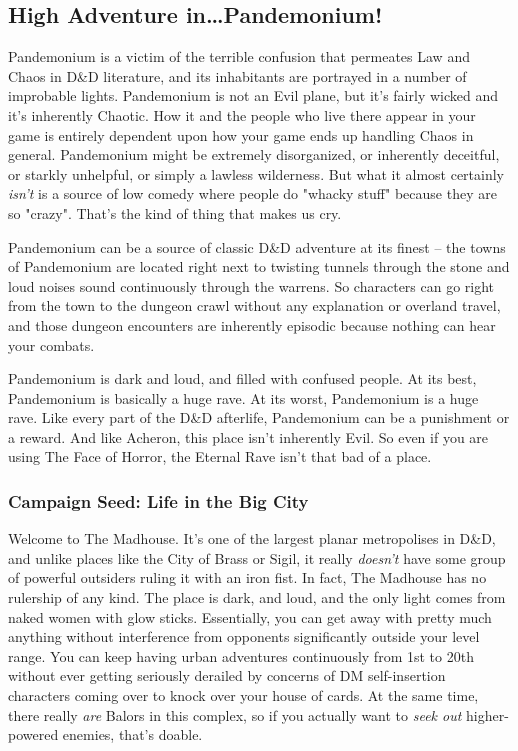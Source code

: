 \subsection{High Adventure in\ldots Pandemonium!}

Pandemonium is a victim of the terrible confusion that permeates Law and Chaos in D\&D literature, and its inhabitants are portrayed in a number of improbable lights. Pandemonium is not an Evil plane, but it's fairly wicked and it's inherently Chaotic. How it and the people who live there appear in your game is entirely dependent upon how your game ends up handling Chaos in general. Pandemonium might be extremely disorganized, or inherently deceitful, or starkly unhelpful, or simply a lawless wilderness. But what it almost certainly \textit{isn't} is a source of low comedy where people do "whacky stuff" because they are so "crazy". That's the kind of thing that makes us cry.

Pandemonium can be a source of classic D\&D adventure at its finest -- the towns of Pandemonium are located right next to twisting tunnels through the stone and loud noises sound continuously through the warrens. So characters can go right from the town to the dungeon crawl without any explanation or overland travel, and those dungeon encounters are inherently episodic because nothing can hear your combats.

Pandemonium is dark and loud, and filled with confused people. At its best, Pandemonium is basically a huge rave. At its worst, Pandemonium is a huge rave. Like every part of the D\&D afterlife, Pandemonium can be a punishment or a reward. And like Acheron, this place isn't inherently Evil. So even if you are using The Face of Horror, the Eternal Rave isn't that bad of a place.

\subsubsection{Campaign Seed: Life in the Big City}

Welcome to The Madhouse. It's one of the largest planar metropolises in D\&D, and unlike places like the City of Brass or Sigil, it really \textit{doesn't} have some group of powerful outsiders ruling it with an iron fist. In fact, The Madhouse has no rulership of any kind. The place is dark, and loud, and the only light comes from naked women with glow sticks. Essentially, you can get away with pretty much anything without interference from opponents significantly outside your level range. You can keep having urban adventures continuously from 1st to 20th without ever getting seriously derailed by concerns of DM self-insertion characters coming over to knock over your house of cards. At the same time, there really \textit{are} Balors in this complex, so if you actually want to \textit{seek out} higher-powered enemies, that's doable.

